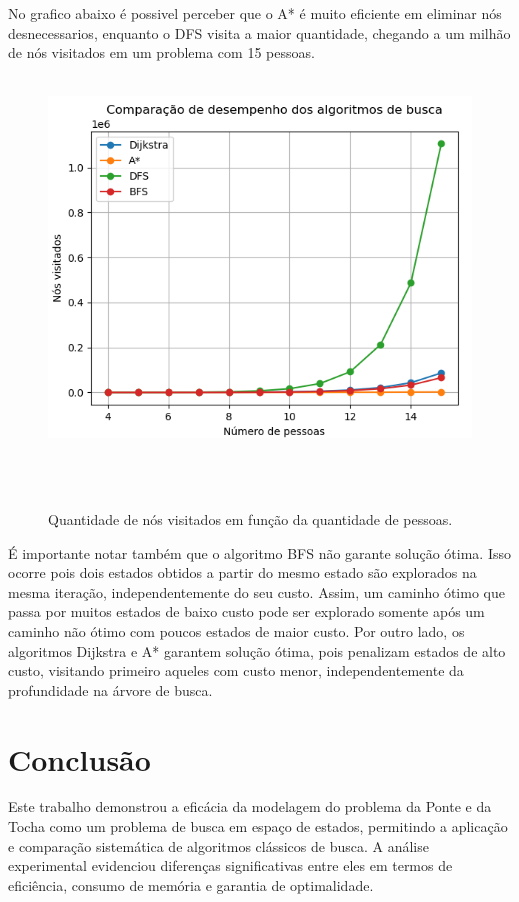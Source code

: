 \documentclass[12pt,a4paper]{article}
\begin{document}
No grafico abaixo é possivel perceber que o A* é muito eficiente em eliminar nós desnecessarios, enquanto o DFS visita a maior quantidade, chegando a um milhão de nós visitados em um problema com 15 pessoas.

\begin{figure}[H]
    \centering
    \includegraphics[width=0.8\linewidth]{node_visited.png}
    \caption{Quantidade de nós visitados em função da quantidade de pessoas.}
    \label{fig:cen2}
\end{figure}

É importante notar também que o algoritmo BFS não garante solução ótima. Isso ocorre pois dois estados obtidos a partir do mesmo estado são explorados na mesma iteração, independentemente do seu custo. Assim, um caminho ótimo que passa por muitos estados de baixo custo pode ser explorado somente após um caminho não ótimo com poucos estados de maior custo.  
Por outro lado, os algoritmos Dijkstra e A* garantem solução ótima, pois penalizam estados de alto custo, visitando primeiro aqueles com custo menor, independentemente da profundidade na árvore de busca.

\section{Conclusão}

Este trabalho demonstrou a eficácia da modelagem do problema da Ponte e da Tocha como um problema de busca em espaço de estados, permitindo a aplicação e comparação sistemática de algoritmos clássicos de busca. A análise experimental evidenciou diferenças significativas entre eles em termos de eficiência, consumo de memória e garantia de optimalidade.  
\end{document}
